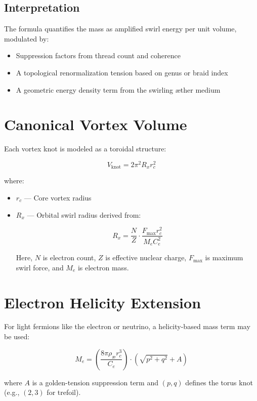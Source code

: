 \documentclass[12pt]{article}
\begin{document}
      \titlepageClose

\subsection*{Interpretation}
The formula quantifies the mass as amplified swirl energy per unit volume, modulated by:
\begin{itemize}
    \item Suppression factors from thread count and coherence
    \item A topological renormalization tension based on genus or braid index
    \item A geometric energy density term from the swirling æther medium
\end{itemize}



\section{Canonical Vortex Volume}
Each vortex knot is modeled as a toroidal structure:

\begin{equation}
    V_{\text{knot}} = 2 \pi^2 R_x r_c^2
\end{equation}

where:
\begin{itemize}
    \item $r_c$ — Core vortex radius
    \item $R_x$ — Orbital swirl radius derived from:

    \[
    R_x = \frac{N}{Z} \cdot \frac{F_{\max} r_c^2}{M_e C_e^2}
    \]

    Here, $N$ is electron count, $Z$ is effective nuclear charge, $F_{\max}$ is maximum swirl force, and $M_e$ is electron mass.
\end{itemize}

\section{Electron Helicity Extension}
For light fermions like the electron or neutrino, a helicity-based mass term may be used:

\begin{equation}
    M_e = \left( \frac{8\pi \rho_{\text{æ}} r_c^3}{C_e} \right) \cdot \left( \sqrt{p^2 + q^2} + A \right)
\end{equation}

where $A$ is a golden-tension suppression term and $(p, q)$ defines the torus knot (e.g., $(2,3)$ for trefoil).
\end{document}
